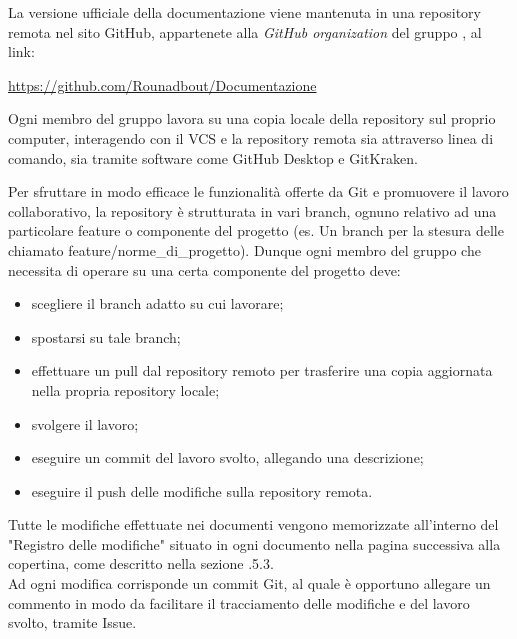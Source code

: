         La versione ufficiale della documentazione viene mantenuta in una repository remota nel sito GitHub, appartenete alla \textit{GitHub organization} del gruppo \Gruppo{}, al link:
        \begin{center}
          \url{https://github.com/Rounadbout/Documentazione}
        \end{center}
        Ogni membro del gruppo lavora su una copia locale della repository sul proprio computer, interagendo con il VCS e la repository remota sia attraverso linea di comando, sia tramite software come GitHub Desktop e GitKraken.

        Per sfruttare in modo efficace le funzionalità offerte da Git e promuovere il lavoro collaborativo, la repository è strutturata in vari branch, ognuno relativo ad una particolare feature o componente del progetto (es. Un branch per la stesura delle \NdP{} chiamato feature/norme\_di\_progetto). Dunque ogni membro del gruppo che necessita di operare su una certa componente del progetto deve:
        \begin{itemize}
          \item scegliere il branch adatto su cui lavorare;
          \item spostarsi su tale branch;
          \item effettuare un pull dal repository remoto per trasferire una copia aggiornata nella propria repository locale;
          \item svolgere il lavoro;
          \item eseguire un commit del lavoro svolto, allegando una descrizione;
          \item eseguire il push delle modifiche sulla repository remota.
        \end{itemize}

        Tutte le modifiche effettuate nei documenti vengono memorizzate all'interno del "Registro delle modifiche" situato in ogni documento nella pagina successiva alla copertina, come descritto nella sezione .5.3.\\
        Ad ogni modifica corrisponde un commit Git, al quale è opportuno allegare un commento in modo da facilitare il tracciamento delle modifiche e del lavoro svolto, tramite Issue.

